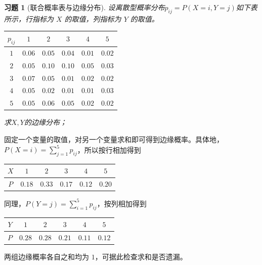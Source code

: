 \documentclass[12pt,fontset=fandol]{ctexart}
\newtheorem{exercise}{习题}[section]
\begin{document}
\begin{exercise}[联合概率表与边缘分布]\label{q:Y4.3}
设离散型概率分布$p_{ij}=P(X=i,Y=j)$如下表所示，行指标为 $X$ 的取值，列指标为 $Y$ 的取值。

\begin{center}
    
    \begin{tabular}{|c|c|c|c|c|c|} \hline 
 $p_{ij}$&  $1$&$2$&$3$&$4$&$5$\\ \hline 
 $1$&  $0.06$&$0.05$    &$0.04$&$0.01$&$0.02$\\ \hline 
         $2$&    $0.05$&$0.10$&$0.10$&$0.05$&$0.03$\\ \hline 
         $3$& 
      $0.07$&$0.05$& $0.01$&$0.02$&$0.02$\\ \hline
 $4$& $0.05$& $0.02$& $0.01$&$0.01$&$0.03$\\\hline
 $5$& $0.05$& $0.06$& $0.05$& $0.02$&$0.02$\\\hline\end{tabular}
\end{center}

求$X,Y$的边缘分布；\par{}
\end{exercise}

\begin{solve}\label{a:Y4.3}固定一个变量的取值，对另一个变量求和即可得到边缘概率。具体地，$P(X=i)=\sum_{j=1}^5p_{ij}$，所以按行相加得到
\begin{center}
    
    \begin{tabular}{|c|c|c|c|c|c|} \hline 
         $X$&  $1$& $2$&$3$& $4$&$5$\\ \hline 
         $P$& 
     $0.18$& $0.33$& $0.17$& $0.12$&$0.20$\\ \hline\end{tabular}

\end{center}
同理，$P(Y=j)=\sum_{i=1}^5p_{ij}$，按列相加得到\begin{center}
    
    \begin{tabular}{|c|c|c|c|c|c|} \hline 
         $Y$&  $1$& $2$&$3$& $4$&$5$\\ \hline 
         $P$& 
     $0.28$& $0.28$& $0.21$& $0.11$&$0.12$\\ \hline\end{tabular}

\end{center}

两组边缘概率各自之和均为 $1$，可据此检查求和是否遗漏。\end{solve}
\end{document}
